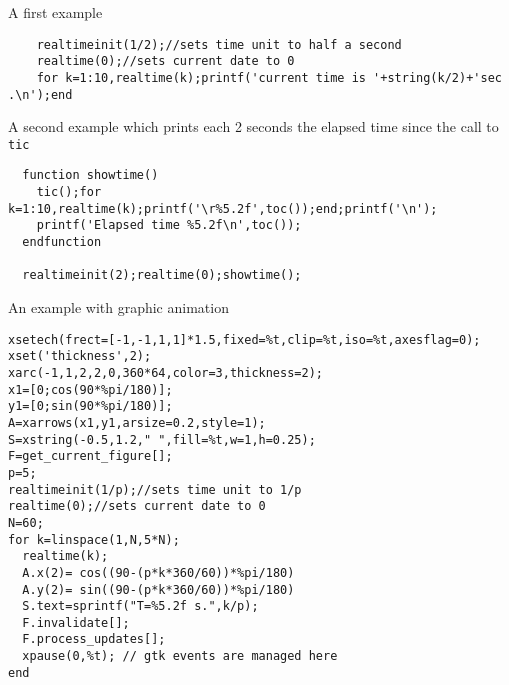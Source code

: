 \begin{examples}

\noindent A first example
  \begin{Verbatim}
    realtimeinit(1/2);//sets time unit to half a second
    realtime(0);//sets current date to 0
    for k=1:10,realtime(k);printf('current time is '+string(k/2)+'sec .\n');end
  \end{Verbatim}

\noindent A second example which prints each 2 seconds the elapsed time since
the call to \verb!tic!
\begin{Verbatim}
  function showtime()
    tic();for k=1:10,realtime(k);printf('\r%5.2f',toc());end;printf('\n');
    printf('Elapsed time %5.2f\n',toc());
  endfunction

  realtimeinit(2);realtime(0);showtime();
\end{Verbatim}

\noindent An example with graphic animation

\begin{Verbatim}
xsetech(frect=[-1,-1,1,1]*1.5,fixed=%t,clip=%t,iso=%t,axesflag=0);
xset('thickness',2);
xarc(-1,1,2,2,0,360*64,color=3,thickness=2);
x1=[0;cos(90*%pi/180)];
y1=[0;sin(90*%pi/180)];
A=xarrows(x1,y1,arsize=0.2,style=1);
S=xstring(-0.5,1.2," ",fill=%t,w=1,h=0.25);
F=get_current_figure[];
p=5;
realtimeinit(1/p);//sets time unit to 1/p
realtime(0);//sets current date to 0
N=60;
for k=linspace(1,N,5*N);
  realtime(k);
  A.x(2)= cos((90-(p*k*360/60))*%pi/180)
  A.y(2)= sin((90-(p*k*360/60))*%pi/180)
  S.text=sprintf("T=%5.2f s.",k/p);
  F.invalidate[];
  F.process_updates[];
  xpause(0,%t); // gtk events are managed here
end
\end{Verbatim}

\end{examples}
